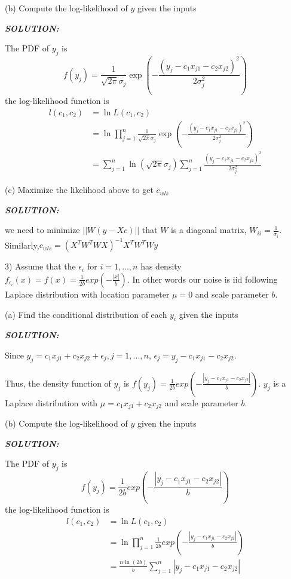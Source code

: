 \documentclass{article}
\theoremstyle{definition}
\theoremstyle{definition}
\theoremstyle{remark}
\begin{document}
\qquad (b) Compute the log-likelihood of $y$ given the inputs

\qquad \emph{\textbf{SOLUTION:}}

\qquad\qquad The PDF of $y_j$ is \[f(y_j)= \frac{1}{\sqrt{2\pi}\sigma_j}\exp\left(-\frac{(y_j-c_1x_{j1}-c_2x_{j2})^2}{2\sigma_j^2}\right)\]
\qquad\qquad the log-likelihood function is
\begin{equation}\nonumber
\begin{aligned}
l(c_1,c_2) &= \ln L(c_1,c_2)\\
           &= \ln \prod_{j=1}^{n} \frac{1}{\sqrt{2\pi}\sigma_j}\exp\left(-\frac{(y_j-c_1x_{j1}-c_2x_{j2})^2}{2\sigma_j^2}\right)\\
           &= \sum_{j=1}^{n}\ln(\sqrt{2\pi}\sigma_j)\sum_{j=1}^{n}\frac{(y_j-c_1x_{j1}-c_2x_{j2})^2}{2\sigma_j^2}
\end{aligned}
\end{equation}

\qquad (c) Maximize the likelihood above to get $c_{wls}$

\qquad \emph{\textbf{SOLUTION:}}

\qquad\qquad we need to minimize $||W(y-Xc)||$ that $W$ is a diagonal matrix, $W_{ii}=\frac{1}{\sigma_i}$. Similarly,$c_{wls} = (X^TW^TWX)^{-1}X^TW^TWy$

3) Assume that the $\epsilon _i$ for $i=1,...,n$ has density $f_{\epsilon_i}(x)=f(x)=\frac{1}{2b}exp(-\frac{|x|}{b})$. In other words our noise is iid following Laplace distribution with location parameter $\mu =0$ and scale parameter $b$.

\qquad (a) Find the conditional distribution of each $y_i$ given the inputs

\qquad \emph{\textbf{SOLUTION:}}

\qquad\qquad Since $y_j=c_1x_{j1}+c_2x_{j2}+\epsilon _j,j=1,...,n $, $\epsilon _j = y_j-c_1x_{j1}-c_2x_{j2}$.

\qquad\qquad Thus, the density function of $y_j$ is $f(y_j)=\frac{1}{2b}exp(-\frac{|y_j-c_1x_{j1}-c_2x_{j2}|}{b})$.
$y_j$ is a Laplace distribution with $\mu=c_1x_{j1}+c_2x_{j2}$ and scale parameter $b$.

\qquad (b) Compute the log-likelihood of $y$ given the inputs

\qquad \emph{\textbf{SOLUTION:}}

\qquad\qquad The PDF of $y_j$ is \[f(y_j)= \frac{1}{2b}exp(-\frac{|y_j-c_1x_{j1}-c_2x_{j2}|}{b})\]
\qquad\qquad the log-likelihood function is
\begin{equation}\nonumber
\begin{aligned}
l(c_1,c_2) &= \ln L(c_1,c_2)\\
           &= \ln \prod_{j=1}^{n} \frac{1}{2b}exp(-\frac{|y_j-c_1x_{j1}-c_2x_{j2}|}{b})\\
           &= \frac{n\ln(2b)}{b}\sum_{j=1}^{n}|y_j-c_1x_{j1}-c_2x_{j2}|
\end{aligned}
\end{equation}
\end{document}
